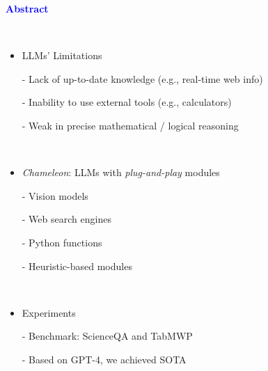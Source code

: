 \documentclass[professionalfont]{beamer}
\begin{document}
\frame{\titlepage}


\begin{frame}
\begin{center}
    { \textbf{\textcolor{blue}{ {\fontsize{12}{14}\selectfont Abstract} }} }
\end{center}
\\[0.3cm]

{\fontsize{10}{14}\selectfont 
\begin{itemize}
    \item LLMs' Limitations
    
    - Lack of up-to-date knowledge (e.g., real-time web info)

    - Inability to use external tools (e.g., calculators)

    - Weak in precise mathematical / logical reasoning

    \\[0.3cm]

    \item \textit{Chameleon}: LLMs with \textit{plug-and-play} modules

    - Vision models

    - Web search engines
    
    - Python functions

    - Heuristic-based modules

    \\[0.3cm]

    \item Experiments

    - Benchmark: ScienceQA and TabMWP

    - Based on GPT-4, we achieved SOTA
\end{itemize}
}

\end{frame}
\end{document}
